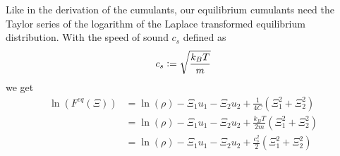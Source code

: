\documentclass{article}
\begin{document}
Like in the derivation of the cumulants, our equilibrium cumulants need the Taylor series of the logarithm of the Laplace transformed equilibrium distribution. With the speed of sound $c_s$ defined as
\begin{equation}
  c_s \mathrel{\mathop:}= \sqrt{\frac{k_B T}{m}}
\end{equation}
we get
\begin{equation}
  \begin{aligned}
    \ln(F^{eq}(\Xi))
      & = \ln(\rho) - \Xi_1 u_1 - \Xi_2 u_2 + \frac{1}{4C}\left(\Xi_1^2 + \Xi_2^2 \right) \\
      & = \ln(\rho) - \Xi_1 u_1 - \Xi_2 u_2 + \frac{k_B T}{2m}\left(\Xi_1^2 + \Xi_2^2 \right) \\
      & = \ln(\rho) - \Xi_1 u_1 - \Xi_2 u_2 + \frac{c_s^2}{2}\left(\Xi_1^2 + \Xi_2^2 \right)
  \end{aligned}
\end{equation}
\end{document}
